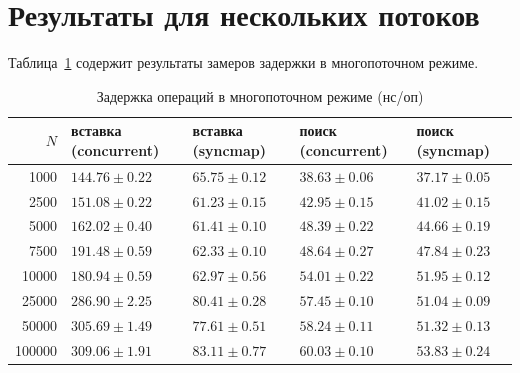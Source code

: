 \documentclass{itmo}
\begin{document}
\section{Результаты для нескольких потоков}

Таблица~\ref{tab:multi-latency} содержит результаты замеров задержки в многопоточном режиме.

\begin{table}[H]
	\centering
	\caption{Задержка операций в многопоточном режиме (нс/оп)}
	\label{tab:multi-latency}
	\begin{tabularx}{\textwidth}{|r|X|X|X|X|}
		\toprule
		$N$ & вставка (concurrent) & вставка (syncmap) & поиск (concurrent) & поиск (syncmap) \\
		\midrule
		1000 & $144.76 \pm 0.22$ & $65.75 \pm 0.12$ & $38.63 \pm 0.06$ & $37.17 \pm 0.05$ \\
		2500 & $151.08 \pm 0.22$ & $61.23 \pm 0.15$ & $42.95 \pm 0.15$ & $41.02 \pm 0.15$ \\
		5000 & $162.02 \pm 0.40$ & $61.41 \pm 0.10$ & $48.39 \pm 0.22$ & $44.66 \pm 0.19$ \\
		7500 & $191.48 \pm 0.59$ & $62.33 \pm 0.10$ & $48.64 \pm 0.27$ & $47.84 \pm 0.23$ \\
		10000 & $180.94 \pm 0.59$ & $62.97 \pm 0.56$ & $54.01 \pm 0.22$ & $51.95 \pm 0.12$ \\
		25000 & $286.90 \pm 2.25$ & $80.41 \pm 0.28$ & $57.45 \pm 0.10$ & $51.04 \pm 0.09$ \\
		50000 & $305.69 \pm 1.49$ & $77.61 \pm 0.51$ & $58.24 \pm 0.11$ & $51.32 \pm 0.13$ \\
		100000 & $309.06 \pm 1.91$ & $83.11 \pm 0.77$ & $60.03 \pm 0.10$ & $53.83 \pm 0.24$ \\
		\bottomrule
	\end{tabularx}
\end{table}
\end{document}
